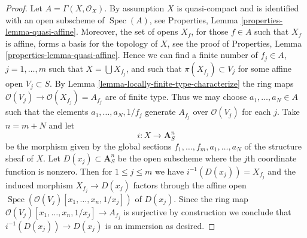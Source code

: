 \documentclass[10pt,a4paper]{amsart}
\theoremstyle{plain}
\theoremstyle{definition}
\theoremstyle{remark}
\numberwithin{equation}{subsection}
\def\Spec{\mathop{\mathrm{Spec}}}
\begin{document}
\begin{proof}
Let $A = \Gamma(X, \mathcal{O}_X)$. By assumption $X$ is quasi-compact
and is identified with an open subscheme of $\Spec(A)$, see
Properties, Lemma \ref{properties-lemma-quasi-affine}.
Moreover, the set of opens $X_f$, for those $f \in A$ such that $X_f$ is
affine, forms a basis for the topology of $X$, see the proof of
Properties, Lemma \ref{properties-lemma-quasi-affine}.
Hence we can find a finite number of $f_j \in A$, $j = 1, \ldots, m$ such that
$X = \bigcup X_{f_j}$, and such that $\pi(X_{f_j}) \subset V_j$ for
some affine open $V_j \subset S$. By
Lemma \ref{lemma-locally-finite-type-characterize}
the ring maps $\mathcal{O}(V_j) \to \mathcal{O}(X_{f_j}) = A_{f_j}$
are of finite type. Thus we may choose $a_1, \ldots, a_N \in A$ such that
the elements $a_1, \ldots, a_N, 1/f_j$ generate
$A_{f_j}$ over $\mathcal{O}(V_j)$ for each $j$. Take $n = m + N$ and
let
$$
i : X \longrightarrow \mathbf{A}^n_S
$$
be the morphism given by the global sections
$f_1, \ldots, f_m, a_1, \ldots, a_N$ of the structure sheaf of $X$.
Let $D(x_j) \subset \mathbf{A}^n_S$ be the open subscheme where the
$j$th coordinate function is nonzero.
Then for $1 \leq j \leq m$ we have $i^{-1}(D(x_j)) = X_{f_j}$ and
the induced morphism $X_{f_j} \to D(x_j)$ factors through the affine
open $\Spec(\mathcal{O}(V_j)[x_1, \ldots, x_n, 1/x_j])$
of $D(x_j)$. Since the ring map
$\mathcal{O}(V_j)[x_1, \ldots, x_n, 1/x_j] \to A_{f_j}$ is
surjective by construction we conclude that $i^{-1}(D(x_j)) \to D(x_j)$
is an immersion as desired.
\end{proof}
\end{document}
